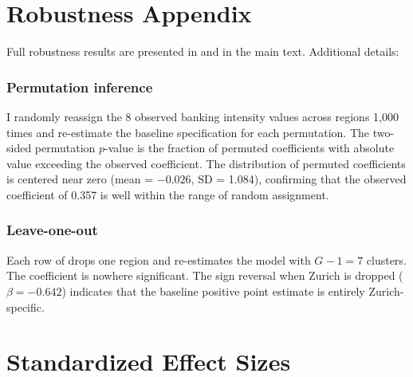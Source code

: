 \documentclass[12pt]{article}
\begin{document}
\section{Robustness Appendix}

Full robustness results are presented in  and  in the main text. Additional details:

\subsubsection*{Permutation inference} I randomly reassign the 8 observed banking intensity values across regions 1,000 times and re-estimate the baseline specification for each permutation. The two-sided permutation $p$-value is the fraction of permuted coefficients with absolute value exceeding the observed coefficient. The distribution of permuted coefficients is centered near zero (mean = $-0.026$, SD = 1.084), confirming that the observed coefficient of 0.357 is well within the range of random assignment.

\subsubsection*{Leave-one-out} Each row of  drops one region and re-estimates the model with $G - 1 = 7$ clusters. The coefficient is nowhere significant. The sign reversal when Zurich is dropped ($\beta = -0.642$) indicates that the baseline positive point estimate is entirely Zurich-specific.

\section{Standardized Effect Sizes}
\label{sec:sde}


\end{document}
